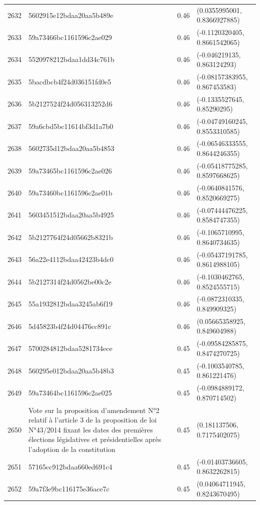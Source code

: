 \begin{table}[ht]
\begin{tabular}{rlrl}
  2632 & 5602915e12bdaa20aa5b489e & 0.46 & (0.0355995001, 0.8366927885) \\ 
  2633 & 59a73466bc1161596c2ae029 & 0.46 & (-0.1120320405, 0.8661542065) \\ 
  2634 & 5520978212bdaa1dd34c761b & 0.46 & (-0.046219135, 0.863124293) \\ 
  2635 & 5bacdbcb4f24d036151fd0e5 & 0.46 & (-0.08157383955, 0.867453583) \\ 
  2636 & 5b2127524f24d056313252d6 & 0.46 & (-0.1335527645, 0.85290295) \\ 
  2637 & 59a6cbd5bc11614bf3d1a7b0 & 0.46 & (-0.04749160245, 0.8553310585) \\ 
  2638 & 5602735d12bdaa20aa5b4853 & 0.46 & (-0.06546333555, 0.8644246355) \\ 
  2639 & 59a73465bc1161596c2ae026 & 0.46 & (-0.05418775285, 0.8597668625) \\ 
  2640 & 59a73460bc1161596c2ae01b & 0.46 & (-0.0640841576, 0.8520669275) \\ 
  2641 & 5603451512bdaa20aa5b4925 & 0.46 & (-0.07444476225, 0.8584747355) \\ 
  2642 & 5b2127764f24d05662b8321b & 0.46 & (-0.1065710995, 0.8640734635) \\ 
  2643 & 56a22e4112bdaa42423b4dc0 & 0.46 & (-0.05437191785, 0.8614988105) \\ 
  2644 & 5b2127314f24d0562be00c2e & 0.46 & (-0.1030462765, 0.8524555715) \\ 
  2645 & 55a1932812bdaa3245ab6f19 & 0.46 & (-0.0872310335, 0.849909325) \\ 
  2646 & 5d45823b4f24d04476cc891c & 0.46 & (0.05665358925, 0.849604988) \\ 
  2647 & 5700284812bdaa5281734ece & 0.45 & (-0.09584285875, 0.8474270725) \\ 
  2648 & 560295e012bdaa20aa5b48b3 & 0.45 & (-0.1003540785, 0.861221476) \\ 
  2649 & 59a73464bc1161596c2ae025 & 0.45 & (-0.0984889172, 0.870714502) \\ 
  2650 & Vote sur la proposition d'amendement N°2 relatif à l'article 3 de la proposition de loi N°43/2014 fixant les dates des premières élections législatives et présidentielles après l'adoption de la constitution & 0.45 & (0.181137506, 0.7175402075) \\ 
  2651 & 57165cc912bdaa660ed691c4 & 0.45 & (-0.01403736605, 0.8632262815) \\ 
  2652 & 59a7f3e9bc116175e36ace7c & 0.45 & (0.04064711945, 0.8243670495) \\ 

\end{tabular}
\end{table}
